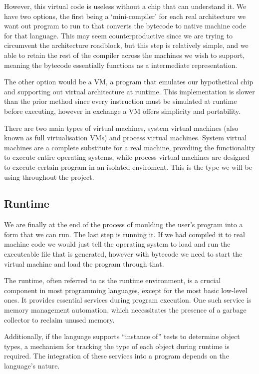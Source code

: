 {However, this virtual code is useless without a chip that can understand it. We have two options, the first being a  `mini-compiler' for each real architecture we want out program to run to that converts the bytecode to native machine code for that language. This may seem counterproductive since we are trying to circumvent the architecture roadblock, but this step is relatively simple, and we able to retain the rest of the compiler across the machines we wish to support, meaning the bytecode essentially functions as a intermediate representation.

The other option would be a \ac{VM}, a program that emulates our hypothetical chip and supporting out virtual architecture at runtime. This implementation is slower than the prior method since every instruction must be simulated at runtime before executing, however in exchange a \ac{VM} offers simplicity and portability. 

There are two main types of virtual machines, system virtual machines (also known as full virtualisation \acsp{VM}) and process virtual machines. System virtual machines are a complete substitute for a real machine, provdiing the functionality to execute entire operating systems, while process virtual machines are designed to execute certain program in an isolated enviroment. This is the type we will be using throughout the project. 

\subsection{Runtime} 

We are finally at the end of the process of moulding the user's program into a form that we can run. The last step is running it. If we had compiled it to real machine code we would just tell the operating system to load and run the executeable file that is generated, however with bytecode we need to start the virtual machine and load the program through that. 

The runtime, often referred to as the runtime environment, is a crucial component in most programming languages, except for the most basic low-level ones. It provides essential services during program execution. One such service is memory management automation, which necessitates the presence of a garbage collector to reclaim unused memory.

Additionally, if the language supports ``instance of'' tests to determine object types, a mechanism for tracking the type of each object during runtime is required. The integration of these services into a program depends on the language's nature.

}
